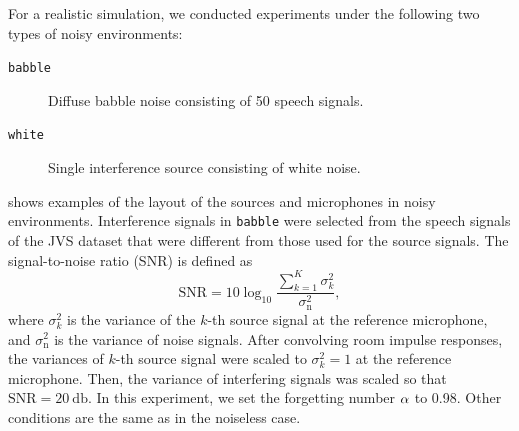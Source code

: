 \documentclass[sip,biber]{now-journal}
\begin{document}
For a realistic simulation, we conducted experiments under the following two types of noisy environments:
\begin{description}
  \item[\texttt{babble}] Diffuse babble noise consisting of 50 speech signals.
  \item[\texttt{white}] Single interference source consisting of white noise.
\end{description}
 shows examples of the layout of the sources and microphones in noisy environments.
Interference signals in \texttt{babble} were selected from the speech signals of the JVS dataset that were different from those used for the source signals.
The signal-to-noise ratio (SNR) is defined as
\begin{equation}
  \text{SNR} = 10 \log _{10} \frac{\sum _{k=1} ^{K} \sigma _{k} ^{2}}{\sigma _{\mathrm{n}} ^{2}},
\end{equation}
where
$\sigma _{k} ^{2}$ is the variance of the $k$-th source signal at the reference microphone,
and $\sigma _{\mathrm{n}} ^{2}$ is the variance of noise signals.
After convolving room impulse responses, the variances of $k$-th source signal were scaled to $\sigma _{k} ^{2} = 1$ at the reference microphone.
Then, the variance of interfering signals was scaled so that $\text{SNR} = \SI{20}{\decibel}$.
In this experiment, we set the forgetting number $\alpha$ to 0.98.
Other conditions are the same as in the noiseless case.
\end{document}
